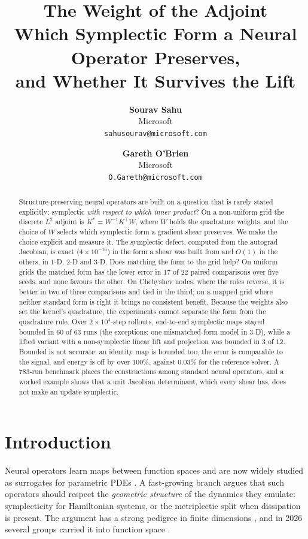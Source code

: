 \documentclass[11pt]{article}
\title{\bfseries\LARGE The Weight of the Adjoint\\[6pt]
\large Which Symplectic Form a Neural Operator Preserves,\\
and Whether It Survives the Lift}
\author{
  \textbf{Sourav Sahu} \\ Microsoft \\ \texttt{sahusourav@microsoft.com}
  \and
  \textbf{Gareth O'Brien} \\ Microsoft \\ \texttt{O.Gareth@microsoft.com}
}
\date{}
\theoremstyle{definition}
\theoremstyle{remark}
\begin{document}
\maketitle

\begin{abstract}
Structure-preserving neural operators are built on a question that is rarely
stated explicitly: symplectic \emph{with respect to which inner product}? On a
non-uniform grid the discrete $L^2$ adjoint is $K^{*}=W^{-1}K^{\top}W$, where
$W$ holds the quadrature weights, and the choice of $W$ selects which
symplectic form a gradient shear preserves. We make the choice explicit and
measure it. The symplectic defect, computed from the autograd Jacobian, is exact
($4\times10^{-16}$) in the form a shear was built from and $O(1)$ in the others,
in $1$-D, $2$-D and $3$-D. Does matching the form to the grid help? On uniform
grids the matched form has the lower error in $17$ of $22$ paired comparisons
over five seeds, and none favours the other. On Chebyshev nodes, where the roles
reverse, it is better in two of three comparisons and tied in the third; on a
mapped grid where neither standard form is right it brings no consistent
benefit. Because the weights also set the kernel's quadrature, the experiments
cannot separate the form from the quadrature rule. Over $2\times10^{4}$-step
rollouts, end-to-end symplectic maps stayed bounded in $60$ of $63$ runs (the
exceptions: one mismatched-form model in $3$-D), while a lifted variant with a
non-symplectic linear lift and projection was bounded in $3$ of $12$. Bounded is
not accurate: an identity map is bounded too, the error is comparable to the
signal, and energy is off by over $100\%$, against $0.03\%$ for the reference
solver. A $783$-run benchmark places the constructions among standard
neural operators, and a worked example shows that a unit Jacobian determinant,
which every shear has, does not make an update symplectic.
\end{abstract}

\section{Introduction}
\label{sec:intro}

Neural operators learn maps between function spaces and are now widely studied
as surrogates for parametric PDEs \citep{kovachki2023neural,li2021fno,lu2021deeponet}.
A fast-growing branch argues that such operators should respect the
\emph{geometric structure} of the dynamics they emulate: symplecticity for Hamiltonian systems, or the metriplectic split when dissipation is present. The
argument has a strong pedigree in finite dimensions
\citep{greydanus2019hnn,jin2020sympnets,cranmer2020lnn,zhong2020symoden}, and in
2026 several groups carried it into function space
\citep{makara2026sno,sulskis2026generic,zhang2026legonet,varghese2026pisonet}.
\end{document}
